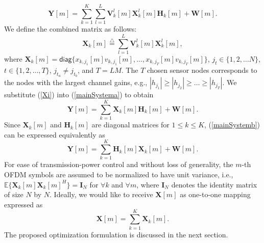 \documentclass[journal]{IEEEtran}
\newcommand{\eqdef}{\stackrel{\triangle}{=}}
\theoremstyle{definition}
\begin{document}
\begin{equation}
\label{mainSystema}
\mathbf{Y}[m] = \sum_{k =1}^K \sum_{l=1}^L  \mathbf{V}_k^l[m] \mathbf{X}_k^l[m] \mathbf{H}_k[m] +\mathbf{W}[m].
\end{equation}
 We define the combined matrix as follows:
\begin{equation}
\label{Xi}
\mathbf{X}_k[m] \eqdef \sum_{l=1}^L  \mathbf{V}_k^l[m] \mathbf{X}_k^l[m],
\end{equation}
\noindent where $\mathbf{X}_k[m] \!=\! \mathsf{diag}\{ x_{k,j_1}[m]v_{k,j_1}[m], \dots, x_{k,j_T}[m]v_{k,j_T}[m]\}$, $j_t \in \{1, 2, \dots N\}$, $t \in \{1,2,\dots, T\}$, $j_{t_a}\neq j_{t_b} $, and $T = LM$. The $T$ chosen sensor nodes corresponds to the nodes with the largest channel gains, e.g., $|h_{j_1}|\geq |h_{j_2}|\geq \dots \geq |h_{j_T}|$. We substitute (\ref{Xi}) into (\ref{mainSystema}) to obtain
\begin{equation}
\label{mainSystemb}
\mathbf{Y}[m] = \sum_{k =1}^K  \mathbf{X}_k[m] \mathbf{H}_k[m] +\mathbf{W}[m].
\end{equation}
Since $\mathbf{X}_k[m]$ and $\mathbf{H}_k[m]$ are diagonal matrices for $1 \leq k \leq K$, (\ref{mainSystemb}) can be expressed equivalently as
\begin{equation}
\label{mainSystemc}
\mathbf{Y}[m] = \sum_{k =1}^K   \mathbf{H}_k[m] \mathbf{X}_k[m] +\mathbf{W}[m].
\end{equation}
For ease of transmission-power control and without loss of generality, the $m$-th OFDM symbols are assumed to be normalized to have unit variance, i.e., $\mathbb{E} \{\mathbf{X}_k[m] \mathbf{X}_k[m]^H\} =\mathbf{I}_N$ for $\forall k$ and $\forall m$, where $\mathbf{I}_N$ denotes the identity matrix of size $N$ by $N$. Ideally, we would like to receive $\mathbf{X}[m]$ as one-to-one mapping expressed as\vspace{-0.2cm}
\begin{equation}
\label{Xm}
\mathbf{X}[m] = \sum_{k =1}^K   \mathbf{X}_k[m].
\end{equation}\vspace{-0.0cm}
The proposed optimization formulation is discussed in the next section. 

\vspace{-0.1cm}
\end{document}
